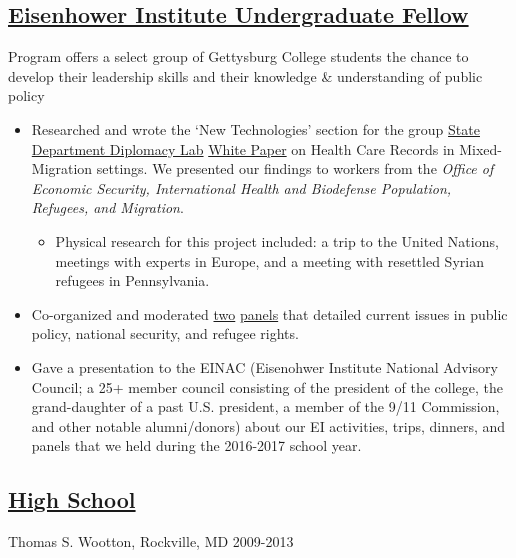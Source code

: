\documentclass[11pt]{article}
\begin{document}
\subsection*{\underline{Eisenhower Institute Undergraduate Fellow}} 
Program offers a select group of Gettysburg College students the chance to develop their leadership skills and their knowledge \& understanding of public policy
\begin{itemize}
\item Researched and wrote the `New Technologies' section for the group \href{https://www.state.gov/s/partnerships/ppp/diplab/}{State Department Diplomacy Lab} \href{https://drive.google.com/file/d/0B5fjh9FZOHSYT1dhVF8yYmd4UEk/view?usp=sharing}{White Paper} on Health Care Records in Mixed-Migration settings. We presented our findings to workers from the \textit{Office of Economic Security, International Health and Biodefense Population, Refugees, and Migration}. 
\begin{itemize}
\item Physical research for this project included: a trip to the United Nations, meetings with experts in Europe, and a meeting with resettled Syrian refugees in Pennsylvania.
\end{itemize}
\item Co-organized and moderated \href{http://cs.gettysburg.edu/~duncjo01/assets/media/EI_panel_f16.pdf}{two} \href{http://cs.gettysburg.edu/~duncjo01/assets/media/EI_panel_s17_second.pdf}{panels} that detailed current issues in public policy, national security, and refugee rights. 
\item Gave a presentation to the EINAC (Eisenohwer Institute National Advisory Council; a 25+ member council consisting of the president of the college, the grand-daughter of a past U.S. president, a member of the 9/11 Commission, and other notable alumni/donors) about our EI activities, trips, dinners, and panels that we held during the 2016-2017 school year.
\end{itemize}

\subsection*{\underline{High School}} 

Thomas S. Wootton, Rockville, MD \hfill 2009-2013
\end{document}
